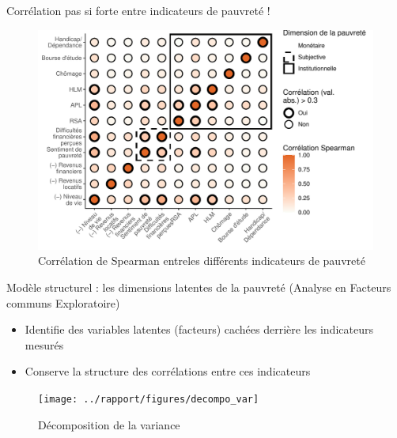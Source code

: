 \documentclass[10pt,xcolor=table,color={dvipsnames,usenames},ignorenonframetext,usepdftitle=false,french]{beamer}
\begin{document}
\begin{frame}{Corrélation pas si forte entre indicateurs de pauvreté !}
\protect\hypertarget{corruxe9lation-pas-si-forte-entre-indicateurs-de-pauvretuxe9}{}
\begin{figure}[!ht]

{\centering \includegraphics[width=1\linewidth]{M2_ANTUNEZ_SQD_ORAL_files/figure-beamer/corrplot-1} 

}

\caption[Corrélation de Spearman entreles différents indicateurs de pauvreté]{Corrélation de Spearman entreles différents indicateurs de pauvreté}\label{fig:corrplot}

\footnotesize
\normalsize\end{figure}
\end{frame}

\begin{frame}{Modèle structurel : les dimensions latentes de la pauvreté
(Analyse en Facteurs communs Exploratoire)}
\protect\hypertarget{moduxe8le-structurel-les-dimensions-latentes-de-la-pauvretuxe9-analyse-en-facteurs-communs-exploratoire}{}
\begin{itemize}
\item
  Identifie des variables latentes (facteurs) cachées derrière les
  indicateurs mesurés
\item
  Conserve la structure des corrélations entre ces indicateurs
\end{itemize}

\bigskip

\begin{figure}[!ht]

{\centering \texttt{[image: ../rapport/figures/decompo\_var]} 

}

\caption[Décomposition de la variance]{Décomposition de la variance}\label{fig:decompovar}

\footnotesize
\normalsize\end{figure}
\end{frame}
\end{document}
